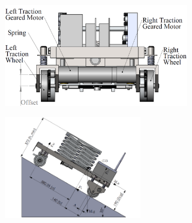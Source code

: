 \begin{figure}
 	\centering
 	\begin{minipage}{.5\textwidth}
 		\centering
 		\includegraphics[width=.9\linewidth,height=4.5cm,keepaspectratio]{Chapter3/fig/WheelOffset}
 		\label{fig:tractionDrive}
 	\end{minipage}%
 	\begin{minipage}{.5\textwidth}
 		\centering
 		\includegraphics[height=4.5cm,keepaspectratio]{Chapter3/fig/loadDist}
 		\label{fig:loadDistribution}
 	\end{minipage}
 \end{figure}
